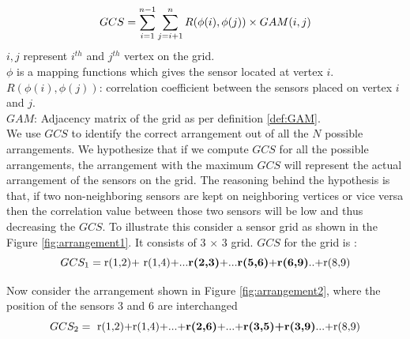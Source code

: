\begin{equation}
\centering
GCS=\sum_{i=1}^{n-1}\sum_{j=i+1}^{n} R(\phi(i),\phi(j))  \times GAM(i,j)
\label{eq:gridCorrelationSum}
\end{equation}
$i,j$ represent $ i^{th}$ and $ j^{th}$ vertex on the grid.\\
$\phi$ is a mapping functions which gives the sensor located at vertex $i$.\\
$ R(\phi(i),\phi(j))$: correlation coefficient between the sensors placed on vertex $i$ and $j$.\\
$GAM$:  Adjacency matrix of the grid as per definition \ref{def:GAM}.\\

We use $GCS$ to identify the correct arrangement out of all the $N$ possible arrangements. We hypothesize that if we compute $GCS$ for all the possible arrangements, the arrangement with the maximum $GCS$ will represent the actual arrangement of the sensors on the grid. The reasoning behind the hypothesis is that, if two non-neighboring sensors are kept on neighboring vertices or vice versa then the correlation value between those two sensors will be low and thus decreasing the $GCS$.
To illustrate this consider a sensor grid as shown in the Figure \ref{fig:arrangement1}.
 It consists of 3 $\times$ 3 grid.  
$GCS$ for the grid is :\\
\begin{equation*}
GCS_{1}=\text{r(1,2)+ r(1,4)+...\textbf{r(2,3)}+...\textbf{r(5,6)}+\textbf{r(6,9)}..+r(8,9)}
\end{equation*}

Now consider the arrangement shown in Figure \ref{fig:arrangement2}, where the position of the sensors 3 and 6 are interchanged\\
\begin{equation*}
GCS_{2}=\text{ r(1,2)+r(1,4)+...+\textbf{r(2,6)}+...+\textbf{r(3,5)+r(3,9)}...+r(8,9)}
\end{equation*}

